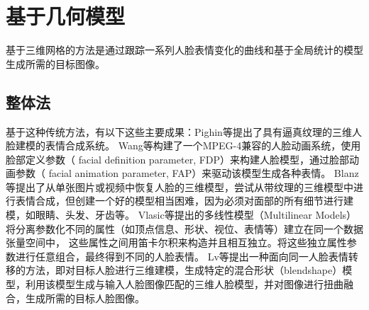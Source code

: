 \documentclass{ctexart}
\begin{document}
\section{\hei 基于几何模型}
基于三维网格的方法是通过跟踪一系列人脸表情变化的曲线和基于全局统计的模型生成所需的目标图像。\par
\subsection{\hei 整体法}
基于这种传统方法，有以下这些主要成果：Pighin等\cite{1}提出了具有逼真纹理的三维人脸建模的表情合成系统。
Wang等\cite{2}构建了一个MPEG-4兼容的人脸动画系统，使用脸部定义参数（ facial definition parameter, FDP）来构建人脸模型，通过脸部动画参数（ facial animation parameter, FAP）来驱动该模型生成各种表情。
Blanz等\cite{3}提出了从单张图片或视频中恢复人脸的三维模型，尝试从带纹理的三维模型中进行表情合成，但创建一个好的模型相当困难，因为必须对面部的所有细节进行建模，如眼睛、头发、牙齿等。
Vlasic等\cite{4}提出的多线性模型（Multilinear Models）将分离参数化不同的属性（如顶点信息、形状、视位、表情等）建立在同一个数据张量空间中， 这些属性之间用笛卡尔积来构造并且相互独立。将这些独立属性参数进行任意组合，最终得到不同的人脸表情。
Lv等\cite{5}提出一种面向同一人脸表情转移的方法，即对目标人脸进行三维建模，生成特定的混合形状（blendshape）模型，利用该模型生成与输入人脸图像匹配的三维人脸模型，并对图像进行扭曲融合，生成所需的目标人脸图像。
\par
\end{document}
